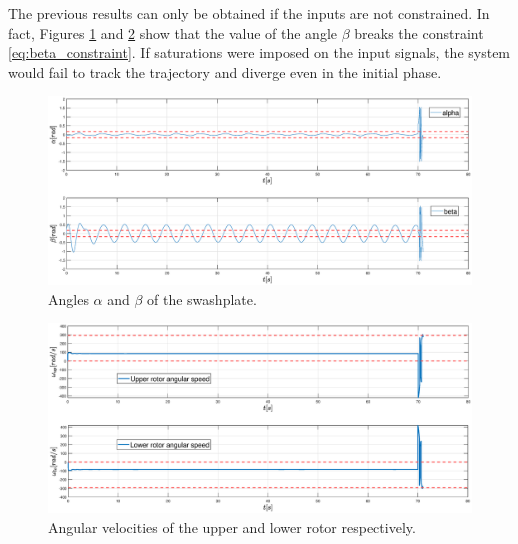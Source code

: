 The previous results can only be obtained if the inputs are not constrained. In fact, Figures \ref{fig:FL_angles} and \ref{fig:FL_omega} show that the value of the angle $\beta$ breaks the constraint \ref{eq:beta_constraint}. If saturations were imposed on the input signals, the system would fail to track the trajectory and diverge even in the initial phase.
\begin{figure}[H]
    \centering
    \includegraphics[scale=0.2]{figures/FL_angles}
    \caption{Angles $\alpha$ and $\beta$ of the swashplate.}
    \label{fig:FL_angles}
\end{figure}
\begin{figure}[H]
    \centering
    \includegraphics[scale=0.2]{figures/FL_omega}
    \caption{Angular velocities of the upper and lower rotor respectively.}
    \label{fig:FL_omega}
\end{figure}

